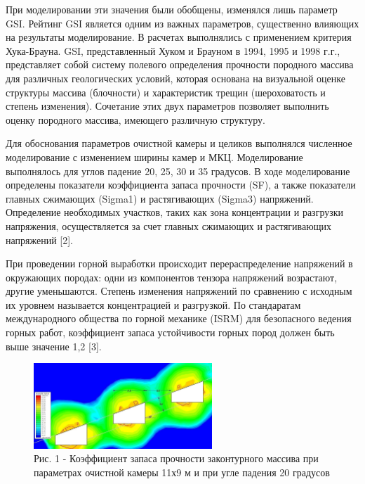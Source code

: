 \begin{multicols}{2}
При моделировании эти значения были обобщены, изменялся лишь параметр
GSI. Рейтинг GSI является одним из важных параметров, существенно
влияющих на результаты моделирование. В расчетах выполнялись с
применением критерия Хука-Брауна. GSI, представленный Хуком и Брауном в
1994, 1995 и 1998 г.г., представляет собой систему полевого определения
прочности породного массива для различных геологических условий, которая
основана на визуальной оценке структуры массива (блочности) и
характеристик трещин (шероховатость и степень изменения). Сочетание этих
двух параметров позволяет выполнить оценку породного массива, имеющего
различную структуру.

Для обоснования параметров очистной камеры и целиков выполнялся
численное моделирование с изменением ширины камер и МКЦ. Моделирование
выполнялось для углов падение 20, 25, 30 и 35 градусов. В ходе
моделирование определены показатели коэффициента запаса прочности (SF),
а также показатели главных сжимающих (Sigma1) и растягивающих (Sigma3)
напряжений. Определение необходимых участков, таких как зона
концентрации и разгрузки напряжения, осуществляется за счет главных
сжимающих и растягивающих напряжений {[}2{]}.

При проведении горной выработки происходит перераспределение напряжений
в окружающих породах: одни из компонентов тензора напряжений возрастают,
другие уменьшаются. Степень изменения напряжений по сравнению с исходным
их уровнем называется концентрацией и разгрузкой. По стандаратам
международного общества по горной механике (ISRM) для безопасного
ведения горных работ, коэффициент запаса устойчивости горных пород
должен быть выше значение 1,2 {[}3{]}.
\end{multicols}

\begin{figure}[H]
	\centering
	\includegraphics[width=0.6\textwidth]{assets/282}
	\caption*{}
    \caption*{ Рис. 1 - Коэффициент запаса прочности законтурного массива при параметрах очистной камеры 11х9 м и при угле падения 20 градусов}
\end{figure}

